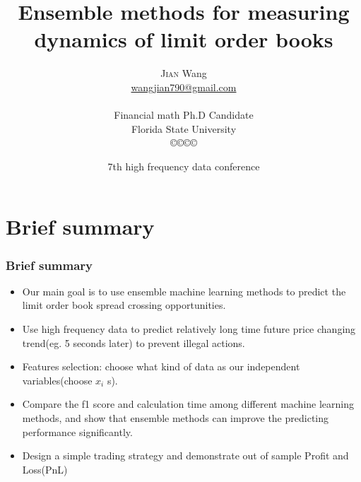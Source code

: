 \documentclass[xcolor={x11names,svgnames,dvipsnames}]{beamer}
\author[\textsc{Jian} Wang]{\textsc{Jian} Wang\\[1ex]%
{\small\url{wangjian790@gmail.com}\\[-.5ex]\url{}}\\
{\small{Financial math Ph.D Candidate}}\\
{\small{Florida State University}}\\
[0.8ex]\copyright\copyright\copyright\copyright} %
\title{Ensemble methods for measuring dynamics of limit order books}
\date[\textsc{Financial seminar} 2016]{7th high frequency data conference\\ }%
\begin{document}
\begin{frame}
\maketitle
\end{frame}



\section{Brief summary}
\begin{frame}
\frametitle{Brief summary}
\begin{itemize}
	\item Our main goal is to use ensemble machine learning methods to predict the limit order book spread \alert{crossing} opportunities.  	
	\item Use high frequency data to predict relatively \alert{long time} future price changing trend(eg. 5 seconds later) to prevent illegal actions.
     \item Features selection: choose what kind of data as our independent variables(\alert{choose $x_i$ s}).  
   	\item Compare the f1 score and calculation time  among different machine learning methods, and show that ensemble methods can improve the \alert{predicting performance} significantly.  	
   	\item Design a simple trading strategy and demonstrate \alert{out of sample} Profit and Loss(PnL)
\end{itemize}
\end{frame}
\end{document}
